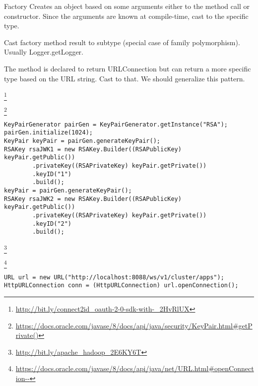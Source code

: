 \begin{pattern}{Factory}
Creates an object based on some arguments either to the method call or constructor.
Since the arguments are known at compile-time, cast to the specific type.

Cast factory method result to subtype (special case of family polymorphism).
Usually Logger.getLogger.

The method is declared to return URLConnection but can return a more specific type based on the URL string.
Cast to that.
We should generalize this pattern.
%

\instances{}
\footnote{\url{http://bit.ly/connect2id_oauth-2-0-sdk-with-_2HvRlUX}}

\footnote{\url{https://docs.oracle.com/javase/8/docs/api/java/security/KeyPair.html\#getPrivate()}}

\begin{verbatim}
KeyPairGenerator pairGen = KeyPairGenerator.getInstance("RSA");
pairGen.initialize(1024);
KeyPair keyPair = pairGen.generateKeyPair();
RSAKey rsaJWK1 = new RSAKey.Builder((RSAPublicKey) keyPair.getPublic())
        .privateKey((RSAPrivateKey) keyPair.getPrivate())
        .keyID("1")
        .build();
keyPair = pairGen.generateKeyPair();
RSAKey rsaJWK2 = new RSAKey.Builder((RSAPublicKey) keyPair.getPublic())
        .privateKey((RSAPrivateKey) keyPair.getPrivate())
        .keyID("2")
        .build();
\end{verbatim}

\footnote{\url{http://bit.ly/apache_hadoop_2E6KY6T}}

\footnote{\url{https://docs.oracle.com/javase/8/docs/api/java/net/URL.html\#openConnection--}}

\begin{verbatim}
URL url = new URL("http://localhost:8088/ws/v1/cluster/apps");
HttpURLConnection conn = (HttpURLConnection) url.openConnection();
\end{verbatim}

\detection{}

\discussion{}

\related{}

\end{pattern}
